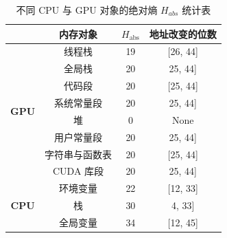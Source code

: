 \begin{table}[t]
\caption{不同 CPU 与 GPU 对象的绝对熵 $H_{abs}$ 统计表}
\label{table: addresses_entropy}
\centering
\small 
\renewcommand{\arraystretch}{1.5} 
\begin{tabular}{cccc}
\hline
\rowcolor[HTML]{C0C0C0} 
                                          & \textbf{内存对象}    & \multicolumn{1}{l}{\textbf{$H_{\text{abs}}$}} & \textbf{地址改变的位数} \\ \hline
\multicolumn{1}{c|}{\multirow{8}{*}{\textbf{GPU}}} & 线程栈    & 19                     & {[}26, 44{]}                   \\
\multicolumn{1}{c|}{}                     & \cellcolor[HTML]{EFEFEF}全局栈            &  \cellcolor[HTML]{EFEFEF}20                     &  \cellcolor[HTML]{EFEFEF}{[}25, 44{]}                    \\
\multicolumn{1}{c|}{}                     & 代码段           & 20                     & {[}25, 44{]}                    \\
\multicolumn{1}{c|}{}                     &  \cellcolor[HTML]{EFEFEF}系统常量段  &  \cellcolor[HTML]{EFEFEF}20                     &  \cellcolor[HTML]{EFEFEF}{[}25, 44{]}                   \\
\multicolumn{1}{c|}{}                     & 堆             & 0                           & None                             \\
\multicolumn{1}{c|}{}                     &  \cellcolor[HTML]{EFEFEF}用户常量段          &  \cellcolor[HTML]{EFEFEF}20                     &  \cellcolor[HTML]{EFEFEF}{[}25, 44{]}                    \\
\multicolumn{1}{c|}{}                     & 字符串与函数表            & 20                     & {[}25, 44{]}                    \\
\multicolumn{1}{c|}{}                     &  \cellcolor[HTML]{EFEFEF}CUDA 库段      &  \cellcolor[HTML]{EFEFEF}20                     &  \cellcolor[HTML]{EFEFEF}{[}25, 44{]}                    \\ \hline
\multicolumn{1}{c|}{\multirow{8}{*}{\textbf{CPU}}} & 环境变量    & 22                     & {[}12, 33{]}                   \\
\multicolumn{1}{c|}{}                     &  \cellcolor[HTML]{EFEFEF}栈            &  \cellcolor[HTML]{EFEFEF}30                     &  \cellcolor[HTML]{EFEFEF}{[}4, 33{]}                     \\
\multicolumn{1}{c|}{}                     & 全局变量 & 34                     & {[}12, 45{]}                    \\

\end{tabular}
\end{table}

